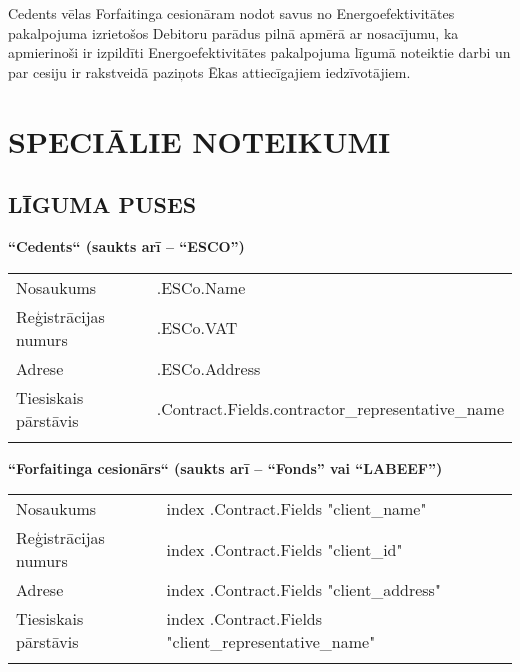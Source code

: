 \documentclass[a4paper]{article}
\begin{document}
Cedents vēlas Forfaitinga cesionāram nodot savus no Energoefektivitātes pakalpojuma izrietošos
Debitoru parādus pilnā apmērā ar nosacījumu, ka apmierinoši ir izpildīti Energoefektivitātes pakalpojuma
līgumā noteiktie darbi un par cesiju ir rakstveidā paziņots Ēkas attiecīgajiem iedzīvotājiem.\par

\pagebreak

\renewcommand\thesection{}
\renewcommand\thesubsection{\arabic{subsection}}
\renewcommand\thesubsubsection{\thesubsection.\arabic{subsubsection}.}

\renewcommand*{\theenumi}{\thesubsection.\arabic{enumi}}
\renewcommand*{\theenumii}{\theenumi.\arabic{enumii}}

\section{SPECIĀLIE NOTEIKUMI}
\vspace{5mm}

\subsection{LĪGUMA PUSES}

\textbf{“Cedents“ (saukts arī – “ESCO”)}

\vspace{2mm}

\begin{tabu}{|X|X[2]|} \tabucline{}
  Nosaukums                  &{{.ESCo.Name}}                                          \\\tabucline{}
  Reģistrācijas numurs   &{{.ESCo.VAT}}                                           \\\tabucline{}
  Adrese               &{{.ESCo.Address}}                                       \\\tabucline{}
  Tiesiskais pārstāvis  &{{.Contract.Fields.contractor_representative_name}}     \\\tabucline{}
\end{tabu}

\vspace{5mm}

\textbf{“Forfaitinga cesionārs“ (saukts arī – “Fonds” vai “LABEEF”)}

\vspace{2mm}

\begin{tabu}{|X|X[2]|} \tabucline{}
  Nosaukums                   &{{index .Contract.Fields "client_name"}}                 \\\tabucline{}
  Reģistrācijas numurs    &{{index .Contract.Fields "client_id"}}                   \\\tabucline{}
  Adrese                &{{index .Contract.Fields "client_address"}}              \\\tabucline{}
  Tiesiskais pārstāvis  &{{index .Contract.Fields "client_representative_name"}}  \\\tabucline{}
\end{tabu}
\end{document}
